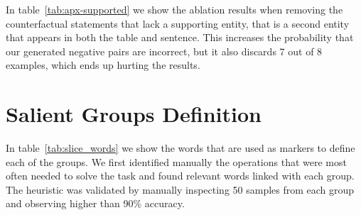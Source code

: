 \documentclass[11pt,a4paper]{article}
\theoremstyle{definition}
\begin{document}
In table~\ref{tab:apx-supported} we show the ablation results when removing the counterfactual statements that lack a supporting entity, that is a second entity that appears in both the table and sentence. This increases the probability that our generated negative pairs are incorrect, but it also discards 7 out of 8 examples, which ends up hurting the results.

\begin{table}[H]
\centering
{}
\caption{Comparisons of training on counterfactual data with and without statements that don't have support mentions.}
\label{tab:apx-supported}
\end{table}

\section{Salient Groups Definition}
\label{sec:slice_words}

In table~\ref{tab:slice_words} we show the words that are used as markers to define each of the groups. We first identified manually the operations that were most often needed to solve the task and found relevant words linked with each group. The heuristic was validated by manually inspecting 50 samples from each group and observing higher than 90\% accuracy.

\begin{table}[H]
\centering
{}
\caption{Trigger words for different groups.}
\label{tab:slice_words}
\end{table} 
\end{document}

